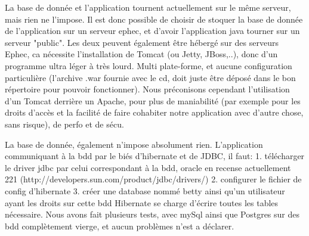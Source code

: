 La base de donnée et l'application tournent actuellement sur le même serveur, mais rien ne l'impose.
Il est donc possible de choisir de stoquer la base de donnée de l'application sur un serveur ephec, et d'avoir l'application java tourner sur un serveur "public".
Les deux peuvent également être hébergé sur des serveurs Ephec, ca nécessite l'installation de Tomcat (ou Jetty, JBoss,..), donc d'un programme ultra léger à très lourd. Multi plate-forme, et aucune configuration particulière (l'archive .war fournie avec le cd, doit juste être déposé dans le bon répertoire pour pouvoir fonctionner).
Nous préconisons cependant l'utilisation d'un Tomcat derrière un Apache, pour plus de maniabilité (par exemple pour les droits d'accès et la facilité de faire cohabiter notre application avec d'autre chose, sans risque), de perfo et de sécu. 

La base de donnée, également n'impose absolument rien. L'application communiquant à la bdd par le biés d'hibernate et de JDBC, il faut:
1. télécharger le driver jdbc par celui correspondant à la bdd, oracle en recense actuellement 221 (http://developers.sun.com/product/jdbc/drivers/)
2. configurer le fichier de config d'hibernate
3. créer une database nommé betty ainsi qu'un utilisateur ayant les droits sur cette bdd 
Hibernate se charge d'écrire toutes les tables nécessaire.  Nous avons fait plusieurs tests, avec mySql ainsi que Postgres sur des bdd complètement vierge, et aucun problèmes n'est a déclarer.




